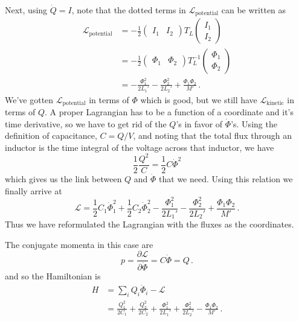 Next, using $\dot{Q}=I$, note that the dotted terms in $\mathcal{L}_\text{potential}$ can be written as
\begin{align*}
  \mathcal{L}_\text{potential}
  &= -\frac{1}{2}
    \begin{pmatrix} I_1 & I_2 \end{pmatrix} T_L \begin{pmatrix} I_1 \\ I_2 \end{pmatrix} \\
  &= -\frac{1}{2}
    \begin{pmatrix} \Phi_1 & \Phi_2 \end{pmatrix}
    T_L^{-1}
    \begin{pmatrix} \Phi_1 \\ \Phi_2 \end{pmatrix} \\
  &= - \frac{\Phi_1^2}{2 L_1'} - \frac{\Phi_2^2}{2 L_2'} + \frac{\Phi_1 \Phi_2}{M'}
  \, .
\end{align*}
We've gotten $\mathcal{L}_\text{potential}$ in terms of $\Phi$ which is good, but we still have $\mathcal{L}_\text{kinetic}$ in terms of $Q$.
A proper Lagrangian has to be a function of a coordinate and it's time derivative, so we have to get rid of the $Q$'s in favor of $\dot \Phi$'s.
Using the definition of capacitance, $C = Q/V$, and noting that the total flux through an inductor is the time integral of the voltage across that inductor, we have
\begin{equation*}
  \frac{1}{2}\frac{Q^2}{C} = \frac{1}{2}C \dot{\Phi}^2
\end{equation*}
which gives us the link between $Q$ and $\dot \Phi$ that we need.
Using this relation we finally arrive at
\begin{equation*}
  \mathcal{L} =
  \frac{1}{2}C_1 \dot{\Phi}_1^2 + \frac{1}{2}C_2 \dot{\Phi}_2^2
  - \frac{\Phi_1^2}{2L_1'} - \frac{\Phi_2^2}{2L_2'}
  + \frac{\Phi_1 \Phi_2}{M'}
  \, .
\end{equation*}
Thus we have reformulated the Lagrangian with the fluxes as the coordinates.

The conjugate momenta in this case are
\begin{equation}
  p = \frac{\partial \mathcal{L}}{\partial \dot{\Phi}} = C \dot{\Phi} = Q \, .
\end{equation}
and so the Hamiltonian is
\begin{align}
  H
  &= \sum_i Q_i \dot{\Phi}_i - \mathcal{L} \nonumber \\
  &=
    \frac{Q_1^2}{2 C_1} + \frac{Q_2^2}{2 C_2}
    + \frac{\Phi_1^2}{2L_1'} + \frac{\Phi_2^2}{2L_2'}
    - \frac{\Phi_1 \Phi_2}{M'}
  \, .
\end{align}
